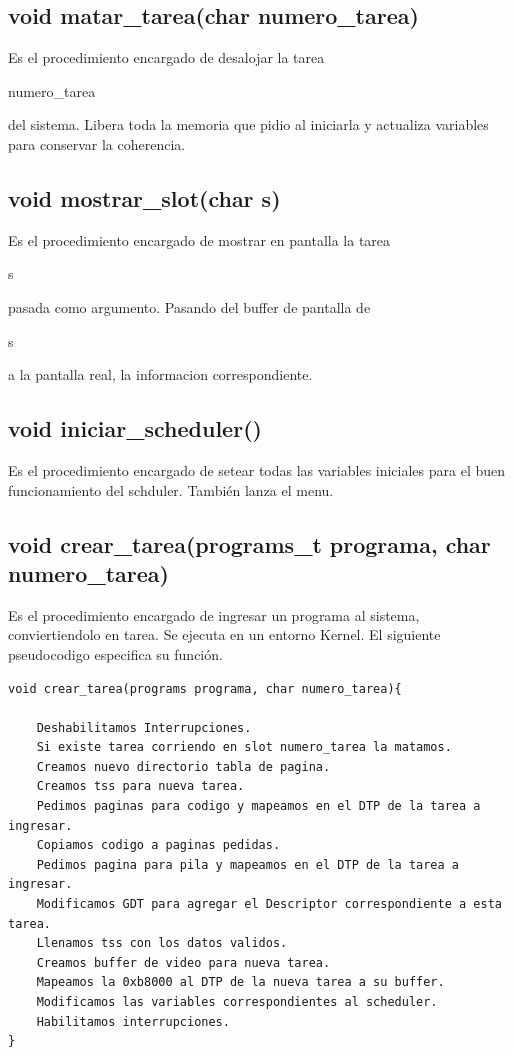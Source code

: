 \documentclass[a4paper,10pt]{article}
\begin{document}
\subsection*{ void matar\_tarea(char numero\_tarea) }
Es el procedimiento encargado de desalojar la tarea \begin{it}numero\_tarea\end{it} del sistema. Libera toda la memoria que pidio al iniciarla y actualiza variables para conservar la coherencia.

\subsection*{void mostrar\_slot(char s)}
Es el procedimiento encargado de mostrar en pantalla la tarea \begin{it}s\end{it} pasada como argumento. Pasando del buffer de pantalla de \begin{it}s\end{it} a la pantalla real, la informacion correspondiente.

\subsection*{void iniciar\_scheduler()}
Es el procedimiento encargado de setear todas las variables iniciales para el buen funcionamiento del schduler. También lanza el menu.

\subsection*{void crear\_tarea(programs\_t programa, char numero\_tarea)}
Es el procedimiento encargado de ingresar un programa al sistema, conviertiendolo en tarea. Se ejecuta en un entorno Kernel.
El siguiente pseudocodigo especifica su función.
\begin{verbatim}
void crear_tarea(programs programa, char numero_tarea){
    
    Deshabilitamos Interrupciones.
    Si existe tarea corriendo en slot numero_tarea la matamos.
    Creamos nuevo directorio tabla de pagina.
    Creamos tss para nueva tarea.
    Pedimos paginas para codigo y mapeamos en el DTP de la tarea a ingresar.
    Copiamos codigo a paginas pedidas.
    Pedimos pagina para pila y mapeamos en el DTP de la tarea a ingresar.
    Modificamos GDT para agregar el Descriptor correspondiente a esta tarea.
    Llenamos tss con los datos validos.
    Creamos buffer de video para nueva tarea.
    Mapeamos la 0xb8000 al DTP de la nueva tarea a su buffer.
    Modificamos las variables correspondientes al scheduler.
    Habilitamos interrupciones.
}
\end{verbatim}
\newpage
\end{document}
